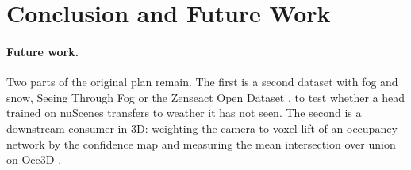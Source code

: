 %
\section{Conclusion and Future Work}
\label{sec:conclusion}


\paragraph{Future work.} Two parts of the original plan remain. The first is a second dataset with fog and snow, Seeing Through Fog \citep{bijelic2020seeing} or the Zenseact Open Dataset \citep{alibeigi2023zod}, to test whether a head trained on nuScenes transfers to weather it has not seen. The second is a downstream consumer in 3D: weighting the camera-to-voxel lift of an occupancy network by the confidence map and measuring the mean intersection over union on Occ3D \citep{tian2023occ3d}. 
